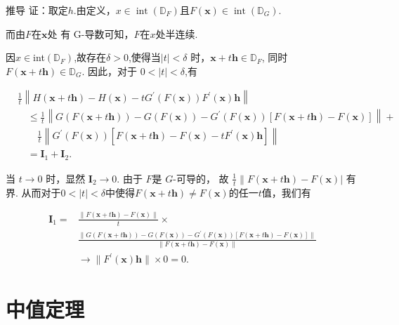 \documentclass{lzureport}
\begin{document}
\begin{derivation}{推导}
	证：取定$h.$由定义，$x\in\operatorname{int}\left(\mathbb{D}_F\right)$且$F(\boldsymbol{x})\in\operatorname{int}\left(\mathbb{D}_G\right).$
	
	而由$F$在$\boldsymbol{x}$处
有 G-导数可知，$F$在$x$处半连续.

	因$x\in$int$(\mathbb{D}_F)$,故存在$\delta>0$,使得当$|t|<\delta$ 时，$\boldsymbol x+t\boldsymbol{h}\in\mathbb{D}_F$, 同时 $F(\boldsymbol x+t\boldsymbol{h})\in\mathbb{D}_G.$ 因此，对于 $0<|t|<\delta$,有

$$
\begin{aligned}
	&\frac1t\left\|H(\boldsymbol{x}+t\boldsymbol{h})-H(\boldsymbol{x})-tG^{\prime}(F(\boldsymbol{x}))F^{\prime}(\boldsymbol{x})\boldsymbol{h}\right\|\\
	&\quad \leqslant\frac1t\left\|G(F(\boldsymbol{x}+t\boldsymbol{h}))-G(F(\boldsymbol{x}))-G^{\prime}(F(\boldsymbol{x}))[F(\boldsymbol{x}+t\boldsymbol{h})-F(\boldsymbol{x})]\right\|+\\
	&\qquad \frac1t\left\|G^{\prime}(F(\boldsymbol{x}))\left[F(\boldsymbol{x}+t\boldsymbol{h})-F(\boldsymbol{x})-tF^{\prime}(\boldsymbol{x})\boldsymbol{h}\right]\right\|\\
	&\quad=\boldsymbol{I}_1+\boldsymbol{I}_2.
\end{aligned}
$$


当 $t\to0$ 时，显然 $\boldsymbol{I}_{2}\to0.$ 由于 $F$是 $G$-可导的，
故 $\frac{1}{t}\|F(\boldsymbol{x}+t\boldsymbol{h})-F(\boldsymbol{x})|$ 有界. 从而对于$0<|t|<\delta$中使得$F(\boldsymbol{x}+t\boldsymbol{h})\neq F(\boldsymbol{x})$的任一$t$值，我们有

$$
\begin{aligned}
	\boldsymbol{I}_1=& \frac{\left\|F(\boldsymbol{x}+t\boldsymbol{h})-F(\boldsymbol{x})\right\|}t\times   \\
	&\frac{\|G(F(\boldsymbol{x}+t\boldsymbol{h}))-G(F(\boldsymbol{x}))-G^{\prime}(F(\boldsymbol{x}))[F(\boldsymbol{x}+t\boldsymbol{h})-F(\boldsymbol{x})]\|}{\|F(\boldsymbol{x}+t\boldsymbol{h})-F(\boldsymbol{x})\|}  \\
	&\to \|F^{\prime}(\boldsymbol{x})\boldsymbol{h}\|\times0=0.
\end{aligned}
$$

\end{derivation}

\section{中值定理}
\end{document}
